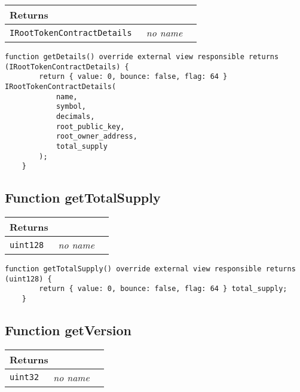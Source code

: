 \ifsoltables
\noindent\begin{tabular}{|l|l|p{5cm}|}\hline
\multicolumn{3}{|l|}{\bf Returns}\\\hline
\tt IRootTokenContractDetails & {\em no name} &\\\hline
\end{tabular}
\fi

\vspace{2cm}

\begin{lstlisting}[firstnumber=77]
    function getDetails() override external view responsible returns (IRootTokenContractDetails) {
        return { value: 0, bounce: false, flag: 64 } IRootTokenContractDetails(
            name,
            symbol,
            decimals,
            root_public_key,
            root_owner_address,
            total_supply
        );
    }
\end{lstlisting}

\subsection{Function getTotalSupply}


\ifsoltables
\noindent\begin{tabular}{|l|l|p{5cm}|}\hline
\multicolumn{3}{|l|}{\bf Returns}\\\hline
\tt uint128 & {\em no name} &\\\hline
\end{tabular}
\fi

\vspace{2cm}

\begin{lstlisting}[firstnumber=92]
    function getTotalSupply() override external view responsible returns (uint128) {
        return { value: 0, bounce: false, flag: 64 } total_supply;
    }
\end{lstlisting}

\subsection{Function getVersion}


\ifsoltables
\noindent\begin{tabular}{|l|l|p{5cm}|}\hline
\multicolumn{3}{|l|}{\bf Returns}\\\hline
\tt uint32 & {\em no name} &\\\hline
\end{tabular}
\fi

\vspace{2cm}

